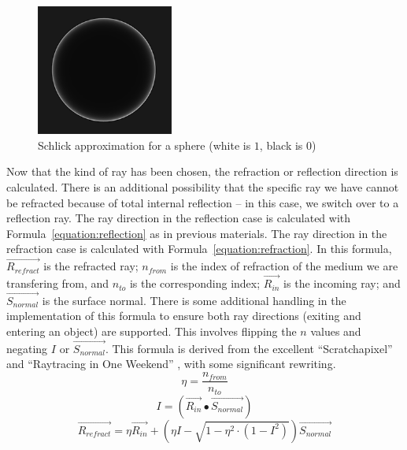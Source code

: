 \vspace{0.3em}
\begin{figure}[htb]
  \centering
  \includegraphics[width=0.4\textwidth]{resources/fresnel}
  \caption{Schlick approximation for a sphere (white is $1$, black is $0$) \cite{learnopengltheory}}
  \label{fig:rayterm-cpu_fresnel}
\end{figure}

Now that the kind of ray has been chosen, the refraction or reflection direction is calculated.
There is an additional possibility that the specific ray we have cannot be refracted because of total internal reflection -- in this case, we switch over to a reflection ray.
The ray direction in the reflection case is calculated with Formula~\ref{equation:reflection} as in previous materials.
The ray direction in the refraction case is calculated with Formula~\ref{equation:refraction}.
In this formula, $\vec{R_{refract}}$ is the refracted ray; $n_{from}$ is the index of refraction of the medium we are transfering from, and $n_{to}$ is the corresponding index; $\vec{R_{in}}$ is the incoming ray; and $\vec{S_{normal}}$ is the surface normal.
There is some additional handling in the implementation of this formula to ensure both ray directions (exiting and entering an object) are supported.
This involves flipping the $n$ values and negating $I$ or $\vec{S_{normal}}$.
This formula is derived from the excellent ``Scratchapixel'' \cite{prunier2017shading} and ``Raytracing in One Weekend'' \cite{shirley2016ray}, with some significant rewriting.
\begin{equation}
  \label{equation:refraction_eta}
  \eta = \frac{n_{from}}{n_{to}}
\end{equation}
\begin{equation}
  \label{equation:refraction_i}
  I = (\vec{R_{in}} \bullet \vec{S_{normal}})
\end{equation}
\begin{equation}
  \label{equation:refraction}
  \vec{R_{refract}} = \eta\vec{R_{in}} + (\eta I - \sqrt{1 - \eta^2 \cdot (1 - I^2)})\vec{S_{normal}}
\end{equation}


